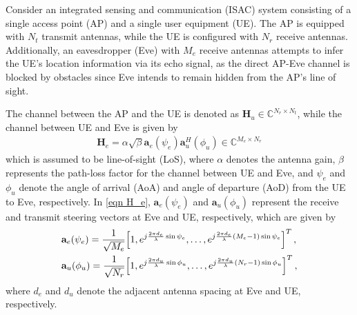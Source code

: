 \documentclass[journal]{IEEEtran}
\begin{document}
Consider an integrated sensing and communication (ISAC) system consisting of a single access point (AP) and a single user equipment (UE). The AP is equipped with $N_t$ transmit antennas, while the UE is configured with $N_r$ receive antennas. Additionally, an eavesdropper (Eve) with $M_e$ receive antennas attempts to infer the UE's location information via its echo signal, as the direct AP-Eve channel is blocked by obstacles since Eve intends to remain hidden from the AP's line of sight. 

The channel between the AP and the UE is denoted as $\mathbf{H}_u \in \mathbb{C}^{N_r \times N_t}$, while the channel between UE and Eve is given by
\begin{align}
\mathbf{H}_{e} = \alpha\sqrt{\beta}\mathbf{a}_e(\psi_e) \mathbf{a}_{u}^H(\phi_{u}) \in \mathbb{C}^{M_e \times N_r} \label{eqn H_e}
\end{align}
which is assumed to be line-of-sight (LoS), where $\alpha$ denotes the antenna gain, $\beta$ represents the path-loss factor for the channel between UE and Eve, and $\psi_e$ and $\phi_{u}$ denote the angle of arrival (AoA) and angle of departure (AoD) from the UE to Eve, respectively. In \eqref{eqn H_e}, $\mathbf{a}_e(\psi_e)$ and $\mathbf{a}_{u}(\phi_{u})$ represent the receive and transmit steering vectors at Eve and UE, respectively, which are given by
\begin{align}
&\mathbf{a}_e(\psi_e) = \frac{1}{\sqrt{M_e}}\!\left[1, e^{j\frac{2\pi d_e}{\lambda}\sin\psi_e}, \dots, e^{j\frac{2\pi d_e}{\lambda}(M_e-1)\sin\psi_e}\right]^T,\notag\\
&\mathbf{a}_{u}(\phi_u) = \frac{1}{\sqrt{N_r}}\!\left[1, e^{j\frac{2\pi d_u}{\lambda}\sin\phi_{u}}, \dots, e^{j\frac{2\pi d_u}{\lambda}(N_r-1)\sin\phi_{u}}\right]^T,\notag
\end{align}
where $d_e$ and $d_u$ denote the adjacent antenna spacing at Eve and UE, respectively.
\end{document}
